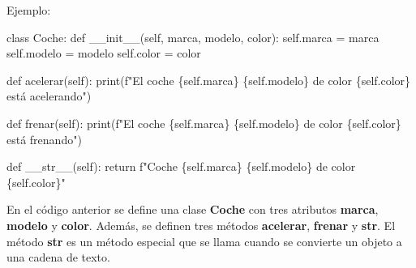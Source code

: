 \documentclass[
  a4paper,
  DIV=11,
  numbers=noendperiod,
  onepage,
  openany]{scrreprt}
\newenvironment{Shaded}{\begin{snugshade}}{\end{snugshade}}
\newcommand{\BuiltInTok}[1]{\textcolor[rgb]{0.00,0.23,0.31}{#1}}
\newcommand{\ControlFlowTok}[1]{\textcolor[rgb]{0.00,0.23,0.31}{#1}}
\newcommand{\FunctionTok}[1]{\textcolor[rgb]{0.28,0.35,0.67}{#1}}
\newcommand{\KeywordTok}[1]{\textcolor[rgb]{0.00,0.23,0.31}{#1}}
\newcommand{\NormalTok}[1]{\textcolor[rgb]{0.00,0.23,0.31}{#1}}
\newcommand{\OperatorTok}[1]{\textcolor[rgb]{0.37,0.37,0.37}{#1}}
\newcommand{\SpecialCharTok}[1]{\textcolor[rgb]{0.37,0.37,0.37}{#1}}
\newcommand{\SpecialStringTok}[1]{\textcolor[rgb]{0.13,0.47,0.30}{#1}}
\newcommand{\VariableTok}[1]{\textcolor[rgb]{0.07,0.07,0.07}{#1}}
\begin{document}
Ejemplo:

\begin{Shaded}
\begin{Highlighting}[]
\KeywordTok{class}\NormalTok{ Coche:}
    \KeywordTok{def} \FunctionTok{\_\_init\_\_}\NormalTok{(}\VariableTok{self}\NormalTok{, marca, modelo, color):}
        \VariableTok{self}\NormalTok{.marca }\OperatorTok{=}\NormalTok{ marca}
        \VariableTok{self}\NormalTok{.modelo }\OperatorTok{=}\NormalTok{ modelo}
        \VariableTok{self}\NormalTok{.color }\OperatorTok{=}\NormalTok{ color}

    \KeywordTok{def}\NormalTok{ acelerar(}\VariableTok{self}\NormalTok{):}
        \BuiltInTok{print}\NormalTok{(}\SpecialStringTok{f"El coche }\SpecialCharTok{\{}\VariableTok{self}\SpecialCharTok{.}\NormalTok{marca}\SpecialCharTok{\}}\SpecialStringTok{ }\SpecialCharTok{\{}\VariableTok{self}\SpecialCharTok{.}\NormalTok{modelo}\SpecialCharTok{\}}\SpecialStringTok{ de color }\SpecialCharTok{\{}\VariableTok{self}\SpecialCharTok{.}\NormalTok{color}\SpecialCharTok{\}}\SpecialStringTok{ está acelerando"}\NormalTok{)}

    \KeywordTok{def}\NormalTok{ frenar(}\VariableTok{self}\NormalTok{):}
        \BuiltInTok{print}\NormalTok{(}\SpecialStringTok{f"El coche }\SpecialCharTok{\{}\VariableTok{self}\SpecialCharTok{.}\NormalTok{marca}\SpecialCharTok{\}}\SpecialStringTok{ }\SpecialCharTok{\{}\VariableTok{self}\SpecialCharTok{.}\NormalTok{modelo}\SpecialCharTok{\}}\SpecialStringTok{ de color }\SpecialCharTok{\{}\VariableTok{self}\SpecialCharTok{.}\NormalTok{color}\SpecialCharTok{\}}\SpecialStringTok{ está frenando"}\NormalTok{)}

    \KeywordTok{def} \FunctionTok{\_\_str\_\_}\NormalTok{(}\VariableTok{self}\NormalTok{):}
        \ControlFlowTok{return} \SpecialStringTok{f"Coche }\SpecialCharTok{\{}\VariableTok{self}\SpecialCharTok{.}\NormalTok{marca}\SpecialCharTok{\}}\SpecialStringTok{ }\SpecialCharTok{\{}\VariableTok{self}\SpecialCharTok{.}\NormalTok{modelo}\SpecialCharTok{\}}\SpecialStringTok{ de color }\SpecialCharTok{\{}\VariableTok{self}\SpecialCharTok{.}\NormalTok{color}\SpecialCharTok{\}}\SpecialStringTok{"}
\end{Highlighting}
\end{Shaded}

En el código anterior se define una clase \textbf{Coche} con tres
atributos \textbf{marca}, \textbf{modelo} y \textbf{color}. Además, se
definen tres métodos \textbf{acelerar}, \textbf{frenar} y
\textbf{\textbf{str}}. El método \textbf{\textbf{str}} es un método
especial que se llama cuando se convierte un objeto a una cadena de
texto.
\end{document}
